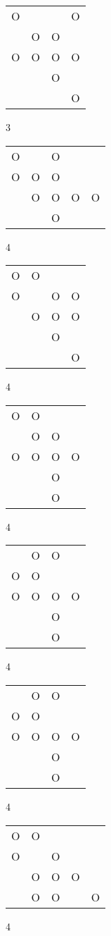 \begin{tabular}{|m{0.2cm}m{0.2cm}m{0.2cm}m{0.2cm}|}\hline
O& & &O\\
 &O&O& \\
O&O&O&O\\
 & &O& \\
 & & &O\\
\hline\end{tabular}3
\begin{tabular}{|m{0.2cm}m{0.2cm}m{0.2cm}m{0.2cm}m{0.2cm}|}\hline
O& &O& & \\
O&O&O& & \\
 &O&O&O&O\\
 & &O& & \\
\hline\end{tabular}4
\begin{tabular}{|m{0.2cm}m{0.2cm}m{0.2cm}m{0.2cm}|}\hline
O&O& & \\
O& &O&O\\
 &O&O&O\\
 & &O& \\
 & & &O\\
\hline\end{tabular}4
\begin{tabular}{|m{0.2cm}m{0.2cm}m{0.2cm}m{0.2cm}|}\hline
O&O& & \\
 &O&O& \\
O&O&O&O\\
 & &O& \\
 & &O& \\
\hline\end{tabular}4
\begin{tabular}{|m{0.2cm}m{0.2cm}m{0.2cm}m{0.2cm}|}\hline
 &O&O& \\
O&O& & \\
O&O&O&O\\
 & &O& \\
 & &O& \\
\hline\end{tabular}4
\begin{tabular}{|m{0.2cm}m{0.2cm}m{0.2cm}m{0.2cm}|}\hline
 &O&O& \\
O&O& & \\
O&O&O&O\\
 & &O& \\
 & &O& \\
\hline\end{tabular}4
\begin{tabular}{|m{0.2cm}m{0.2cm}m{0.2cm}m{0.2cm}m{0.2cm}|}\hline
O&O& & & \\
O& &O& & \\
 &O&O&O& \\
 &O&O& &O\\
\hline\end{tabular}4
